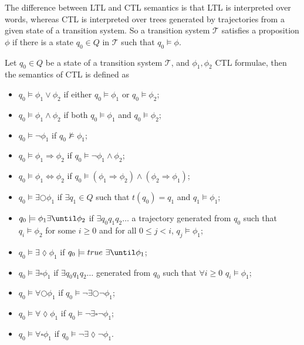 The difference between LTL and CTL semantics is that LTL is interpreted over words, whereas CTL is interpreted over trees generated by trajectories from a given state of a transition system. So a transition system $\mathcal{T}$ satisfies a proposition $\phi$ if there is a state $q_{0}\in Q$ in $\mathcal{T}$ such that $q_{0}\models \phi$.
\begin{defi}
Let $q_{0}\in Q$ be a state of a transition system $\mathcal{T}$, and $\phi_{1},\phi_{2}$ CTL formulae, then the semantics of CTL is defined as
\begin{itemize}
    \item{$q_{0}\models\phi_{1}\lor\phi_{2}$ if either $q_{0}\models\phi_{1}$ or $q_{0}\models\phi_{2}$;}
    \item{$q_{0}\models\phi_{1}\land\phi_{2}$ if both $q_{0}\models\phi_{1}$ and $q_{0}\models\phi_{2}$;}
    \item{$q_{0}\models\lnot\phi_{1}$ if $q_{0}\not\models\phi_{1}$;}
    \item{$q_{0}\models\phi_{1}\Rightarrow\phi_{2}$ if $q_{0}\models\lnot\phi_{1} \land \phi_{2}$;}
    \item{$q_{0}\models\phi_{1}\Leftrightarrow\phi_{2}$ if $q_{0}\models(\phi_{1}\Rightarrow\phi_{2})\land(\phi_{2}\Rightarrow\phi_{1})$;}
    \item{$q_{0}\models\exists\bigcirc\phi_{1}$ if $\exists q_{1}\in Q$ such that
    $t(q_{0})=q_{1}$ and $q_{1}\models \phi_{1}$;}
    \item{$q_{0}\models\phi_{1}\exists\until\phi_{2}$ if $\exists q_{0}q_{1}q_{2}\ldots$ a trajectory generated from $q_{0}$ such that $q_{i}\models \phi_{2}$ for some $i\geq 0$ and for all $0\leq j < i$, $q_{j}\models \phi_{1}$;}
    \item{$q_{0}\models\exists\lozenge\phi_{1}$ if $q_{0}\models true\ \exists\until \phi_{1}$;}
    \item{$q_{0}\models\exists\square\phi_{1}$ if $\exists q_{0}q_{1}q_{2}\ldots$ generated from $q_{0}$ such that $\forall i\geq 0$ $q_{i}\models\phi_{1}$;}

    \item{$q_{0}\models\forall\bigcirc\phi_{1}$ if $q_{0}\models\lnot\exists\bigcirc\lnot\phi_{1}$;}
    \item{$q_{0}\models\forall\lozenge\phi_{1}$ if $q_{0}\models\lnot\exists\square\lnot\phi_{1}$;}
    \item{$q_{0}\models\forall\square\phi_{1}$ if $q_{0}\models\lnot\exists\lozenge\lnot\phi_{1}$.}
\end{itemize}
\end{defi}

